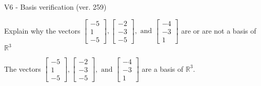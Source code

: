 \begin{exercise}
  \begin{exerciseTitle}V6 - Basis verification (ver. 259)\end{exerciseTitle}
  \begin{exerciseStatement}
    Explain why the vectors \(\left[\begin{array}{r}
-5 \\
1 \\
-5
\end{array}\right] , \left[\begin{array}{r}
-2 \\
-3 \\
-5
\end{array}\right] , \text{ and } \left[\begin{array}{r}
-4 \\
-3 \\
1
\end{array}\right]\) are or are not a basis of \(\mathbb{R}^3\)	


  \end{exerciseStatement}
  \begin{exerciseAnswer}
   The vectors \(\left[\begin{array}{r}
-5 \\
1 \\
-5
\end{array}\right] , \left[\begin{array}{r}
-2 \\
-3 \\
-5
\end{array}\right] , \text{ and } \left[\begin{array}{r}
-4 \\
-3 \\
1
\end{array}\right]\) 
  	 are  a basis of \(\mathbb{R}^3\).
  


  \end{exerciseAnswer}
\end{exercise}